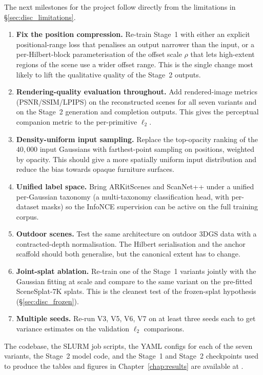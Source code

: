 The next milestones for the project follow directly from the limitations in \S\ref{sec:disc_limitations}.

\begin{enumerate}
\item \textbf{Fix the position compression.} Re-train Stage~1 with either an explicit positional-range loss that penalises an output narrower than the input, or a per-Hilbert-block parameterisation of the offset scale $\rho$ that lets high-extent regions of the scene use a wider offset range. This is the single change most likely to lift the qualitative quality of the Stage~2 outputs.
\item \textbf{Rendering-quality evaluation throughout.} Add rendered-image metrics (PSNR/SSIM/LPIPS) on the reconstructed scenes for all seven variants and on the Stage~2 generation and completion outputs. This gives the perceptual companion metric to the per-primitive $\ell_2$.
\item \textbf{Density-uniform input sampling.} Replace the top-opacity ranking of the $40{,}000$ input Gaussians with farthest-point sampling on positions, weighted by opacity. This should give a more spatially uniform input distribution and reduce the bias towards opaque furniture surfaces.
\item \textbf{Unified label space.} Bring ARKitScenes and ScanNet++ under a unified per-Gaussian taxonomy (a multi-taxonomy classification head, with per-dataset masks) so the InfoNCE supervision can be active on the full training corpus.
\item \textbf{Outdoor scenes.} Test the same architecture on outdoor 3DGS data with a contracted-depth normalisation. The Hilbert serialisation and the anchor scaffold should both generalise, but the canonical extent has to change.
\item \textbf{Joint-splat ablation.} Re-train one of the Stage~1 variants jointly with the Gaussian fitting at scale and compare to the same variant on the pre-fitted SceneSplat-7K splats. This is the cleanest test of the frozen-splat hypothesis (\S\ref{sec:disc_frozen}).
\item \textbf{Multiple seeds.} Re-run V3, V5, V6, V7 on at least three seeds each to get variance estimates on the validation $\ell_2$ comparisons.
\end{enumerate}

The codebase, the SLURM job scripts, the YAML configs for each of the seven variants, the Stage~2 model code, and the Stage~1 and Stage~2 checkpoints used to produce the tables and figures in Chapter~\ref{chap:results} are available at \repo. 